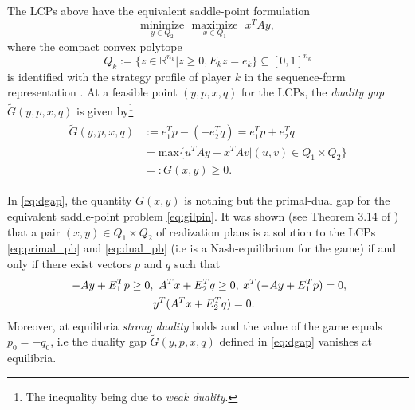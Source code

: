 \documentclass{article}
\begin{document}
The LCPs above have the equivalent saddle-point formulation
\begin{equation}
  \underset{y \in Q_2}{\text{minimize}}\text{ }\underset{x \in
    Q_1}{\text{maximize}}\text{ }x^TAy,
  \label{eq:gilpin}
\end{equation}
where the compact convex polytope
\begin{equation}
  Q_k := \{z \in \mathbb{R}^{n_k} | z \ge 0, E_kz = e_k\} \subseteq
  [0, 1]^{n_k}
\label{eq:polytope}
\end{equation}
is identified with the strategy profile of player $k$ in the
sequence-form representation
\cite{koller1992complexity,koller1994fast,von1996efficient,vonequilibrium}. At
a feasible point $(y, p, x, q)$ for
the LCPs, the \textit{duality gap} $\tilde{G}(y, p, x, q)$ is
given by\footnote{The inequality being due to \textit{weak duality}.}
\begin{eqnarray}
  \begin{split}
  \tilde{G}(y, p, x, q) &:= e_1^Tp - (-e_2^Tq) = e_1^Tp + e_2^Tq\\
  &= \mathrm{max}\{u^TAy - x^TAv| (u,v) \in Q_1 \times Q_2\}\\
  &=:G(x, y) \ge 0.
\end{split}
  \label{eq:dgap}
\end{eqnarray}

In \eqref{eq:dgap}, the quantity $G(x, y)$ is nothing but the primal-dual
gap for the equivalent saddle-point problem \eqref{eq:gilpin}.
It was shown (see Theorem 3.14 of \cite{vonequilibrium}) that a pair
$(x, y) \in Q_1 \times Q_2$ of realization plans is a solution to the
LCPs \eqref{eq:primal_pb} and \eqref{eq:dual_pb} (i.e is a
Nash-equilibrium for the game)  if and only if there exist vectors $p$
and $q$ such that
\begin{equation}
\begin{split}
\hspace{.25em} -Ay + E_1^Tp \ge 0, &\hspace{.5em}A^Tx + E_2^Tq \ge
0, \hspace{.25em} x^T(-Ay + E_1^Tp) = 0,\\
&y^T(A^Tx  + E_2^Tq) = 0.
\end{split}
\label{eq:feasibility}
\end{equation}
Moreover, at equilibria \textit{strong duality} holds and the value
of the game equals $p_0 = -q_0$, i.e the duality gap
$\tilde{G}(y, p, x, q)$ defined in \eqref{eq:dgap} vanishes at
equilibria.%
\end{document}

